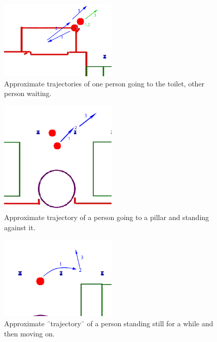 \documentclass[11pt, a4paper]{book}
\begin{document}
\begin{figure}
\centering
\includegraphics[width=0.5\textwidth]{"./qualitative experiment pictures/zoomed_in_toiletsituation_reallife"}
\caption{Approximate trajectories of one person going to the toilet, other person waiting.}
\label{fig:reallifetoilettrajectory}
\end{figure}
\begin{figure}
\centering
\includegraphics[width=0.5\textwidth]{"./qualitative experiment pictures/zoomed_in_leanagainstpillar_reallife"}
\caption{Approximate trajectory of a person going to a pillar and standing against it.}
\label{fig:reallifepillartrajectory}
\end{figure}
\begin{figure}
\centering
\includegraphics[width=0.5\textwidth]{"./qualitative experiment pictures/zoomed_in_standstill_reallife"}
\caption{Approximate ¨trajectory¨ of a person standing still for a while and then moving on.}
\label{fig:reallifestandstilltrajectory}
\end{figure}
\end{document}
